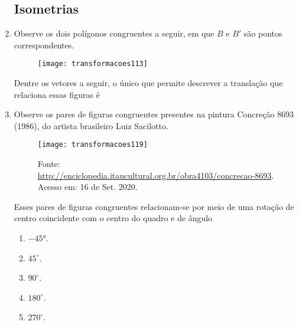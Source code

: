 \begin{enumerate}
\subsection{Isometrias}

\item Observe os dois polígonos congruentes a seguir, em que $B$ e $B'$ são pontos correspondentes. 
 \begin{figure}[H]
 \centering
 
 \texttt{[image: transformacoes113]}
 \end{figure}

Dentre os vetores a seguir, o único que permite descrever a translação que relaciona essas figuras é
\begin{enumerate}[itemsep=1em]
\end{enumerate}
 

\item Observe os pares de figuras congruentes presentes na pintura Concreção 8693 (1986), do artista brasileiro Luiz Sacilotto.

 
\begin{figure}[H]
\centering

\texttt{[image: transformacoes119]}
\caption{Fonte: \url{http://enciclopedia.itaucultural.org.br/obra4103/concrecao-8693}. Acesso em: 16 de Set. 2020.}
\end{figure}

Esses pares de figuras congruentes relacionam-se por meio de uma rotação de centro coincidente com o centro do quadro e de ângulo
\begin{enumerate}
\item $-45°$.
\item $45^{\circ}$.
\item $90^{\circ}$.
\item $180^{\circ}$.
\item $270^{\circ}$.
\end{enumerate}



\end{enumerate}
